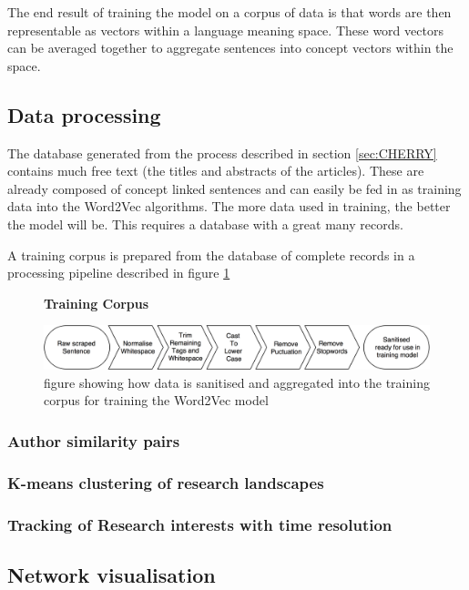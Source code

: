 \documentclass[11pt, oneside]{article}   	%
\begin{document}
The end result of training the model on a corpus of data is that words are then representable as vectors within a language meaning space. These word vectors can be averaged together to aggregate sentences into concept vectors within the space.
\subsection{Data processing}
The database generated from the process described in section \ref{sec:CHERRY} contains much free text (the titles and abstracts of the articles). These are already composed of concept linked sentences and can easily be fed in as training data into the Word2Vec algorithms. The more data used in training, the better the model will be. This requires a database with a great many records\cite{HEWHOHASDATA}\cite{WORD2VEC}. 

A training corpus is prepared from the database of complete records in a processing pipeline described in figure \ref{fig:CORPUSGEN}
\begin{figure}[H]
    \centering
    \textbf{Training Corpus}\par\medskip
    \includegraphics[scale=0.14]{CORPUSGEN.png}
    \caption{figure showing how data is sanitised and aggregated into the training corpus for training the Word2Vec model \label{fig:CORPUSGEN}}
\end{figure}
\subsubsection{Author similarity pairs}
\subsubsection{K-means clustering of research landscapes}
\subsubsection{Tracking of Research interests with time resolution}
\subsection{Network visualisation}
\end{document}
